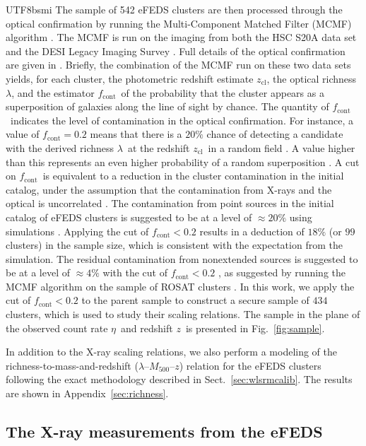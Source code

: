 \documentclass[longauth]{aa}
\newcommand{\Mfiveoo}{\ensuremath{M_{500}}}
\newcommand{\redshift}{\ensuremath{z}}
\newcommand{\fcont}{\ensuremath{f_{\mathrm{cont}}}}
\newcommand{\rich}{\ensuremath{\lambda}}
\newcommand{\zcl}{\ensuremath{z_{\mathrm{cl}}}}
\newcommand{\rate}{\ensuremath{\eta}}
\newcommand{\percent}{\ensuremath{\%}}
\begin{document}
\begin{CJK*}{UTF8}{bsmi}
The sample of 542 eFEDS clusters are then processed through the optical confirmation by running the Multi-Component Matched Filter (MCMF) algorithm \citep{klein18}.
The MCMF is run on the imaging from both the HSC S20A data set and the DESI Legacy Imaging Survey \citep{dey19}.
Full details of the optical confirmation are given in \cite{klein21}.
Briefly, the combination of the MCMF run on these two data sets yields, for each cluster, the photometric redshift estimate \zcl, the optical richness \rich, and the estimator \fcont\ of the probability that the cluster appears as a superposition of galaxies along the line of sight by chance.
The quantity of \fcont\ indicates the level of contamination in the optical confirmation.
For instance, a value of $\fcont=0.2$ means that there is a $20\percent$ chance of detecting a candidate with the derived richness \rich\ at the redshift \zcl\ in a random field \citep[see also][]{klein19}.
A value higher than this represents an even higher probability of a random superposition \citep{klein21}.
A cut on \fcont\ is equivalent to a reduction in the cluster contamination in the initial catalog, under the assumption that the contamination from X-rays and the optical is uncorrelated \citep[see also the discussion at length in][]{grandis20}.
The contamination from point sources in the initial catalog of eFEDS clusters is suggested to be at a level of $\approx20\percent$ using simulations \citep{liu21}.
Applying the cut of $\fcont<0.2$ results in a deduction of $18\percent$ (or $99$ clusters) in the sample size, which is consistent with the expectation from the simulation.
The residual contamination from nonextended sources is suggested to be at a level of $\approx4\percent$ with the cut of $\fcont<0.2$ \citep{klein19}, as suggested by running the MCMF algorithm on the sample of ROSAT clusters \citep{boller16}.
In this work, we apply the cut of $\fcont<0.2$ to the parent sample to construct a secure sample of $434$ clusters, which  is used to study their scaling relations.
The sample in the plane of the observed count rate \rate\ and redshift \redshift\ is presented in Fig.~\ref{fig:sample}.

In addition to the X-ray scaling relations, we also perform a modeling of the richness-to-mass-and-redshift (\rich--\Mfiveoo--\redshift) relation for the eFEDS clusters following the exact methodology described in Sect.~\ref{sec:wlsrmcalib}.
The results are shown in Appendix~\ref{sec:richness}.

\subsection{The X-ray measurements from the eFEDS}
\label{sec:xray_data}



\end{CJK*}
\end{document}
